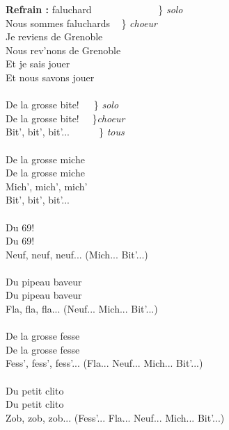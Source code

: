
\noindent
\textbf{Refrain :}
 faluchard  ~~~~~~~~~~~~~\} \textit{solo}
\\Nous sommes faluchards ~ \} \textit{choeur}
\\Je reviens de Grenoble 
\\Nous rev'nons de Grenoble
\\Et je sais jouer 
\\Et nous savons jouer 
\\\\De la grosse bite!~~~\} \textit{solo}
\\De la grosse bite! ~~\}\textit{choeur}
\\Bit', bit', bit'...~~~~~~\} \textit{tous}
\\\\De la grosse miche
\\De la grosse miche
\\Mich', mich', mich'
\\Bit', bit', bit'...
\\\\Du 69!
\\Du 69!
\\Neuf, neuf, neuf... (Mich... Bit'...)
\\\\Du pipeau baveur
\\Du pipeau baveur
\\Fla, fla, fla... (Neuf... Mich... Bit'...)
\\\\De la grosse fesse
\\De la grosse fesse
\\Fess', fess', fess'... (Fla... Neuf... Mich... Bit'...)
\\\\Du petit clito
\\Du petit clito
\\Zob, zob, zob... (Fess'... Fla... Neuf... Mich... Bit'...)

\breakpage